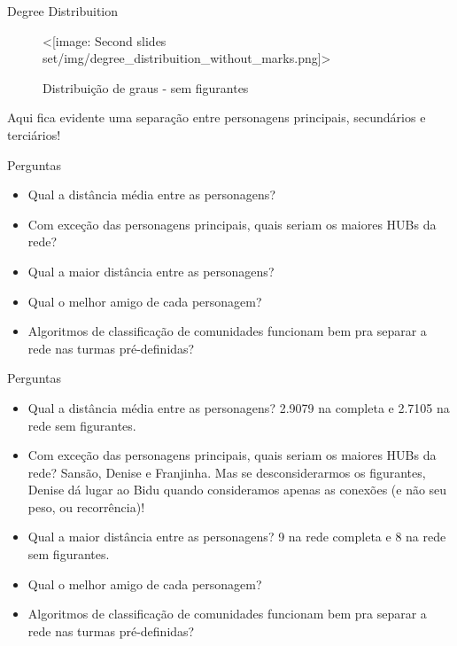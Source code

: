 \documentclass{beamer}
\def\texttt#1{<#1>}%
\begin{document}
\begin{frame}{Degree Distribuition}
\begin{figure}
    \centering
    \texttt{[image: Second slides set/img/degree\_distribuition\_without\_marks.png]}
    \caption{Distribuição de graus - sem figurantes}
\end{figure}

Aqui fica evidente uma separação entre personagens principais, secundários e terciários!
\end{frame}

\begin{frame}{Perguntas}
\begin{itemize}
    \item Qual a distância média entre as personagens?
    \vspace{12pt}
    
    \item Com exceção das personagens principais, quais seriam os maiores HUBs da rede?
    \vspace{12pt}
    
    \item Qual a maior distância entre as personagens?
    \vspace{12pt}
    
    \item Qual o melhor amigo de cada personagem?
    \vspace{12pt}
    
    \item Algoritmos de classificação de comunidades funcionam bem pra separar a rede nas turmas pré-definidas?
\end{itemize}
\end{frame}
    
\begin{frame}{Perguntas}
\begin{itemize}
    \item Qual a distância média entre as personagens? 
    2.9079 na completa e 2.7105 na rede sem figurantes.
    \vspace{12pt}
    
    \item Com exceção das personagens principais, quais seriam os maiores HUBs da rede? 
    Sansão, Denise e Franjinha. Mas se desconsiderarmos os figurantes, Denise dá lugar ao Bidu quando consideramos apenas as conexões (e não seu peso, ou recorrência)!
    \vspace{12pt}
    
    \item Qual a maior distância entre as personagens? 
    9 na rede completa e 8 na rede sem figurantes.
    \vspace{12pt}
    
    \item Qual o melhor amigo de cada personagem?
    \vspace{12pt}
    
    \item Algoritmos de classificação de comunidades funcionam bem pra separar a rede nas turmas pré-definidas?
\end{itemize}
\end{frame}
\end{document}
